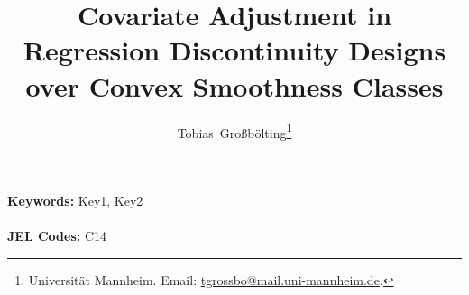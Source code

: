\documentclass[12pt]{article}
\title{Covariate Adjustment in Regression Discontinuity Designs over Convex Smoothness Classes}
\author{
Tobias~Großbölting\thanks{Universität Mannheim. Email: \href{tgrossbo@mail.uni-mannheim.de}{tgrossbo@mail.uni-mannheim.de}.}
}
\begin{document}
\maketitle


 

\vspace{0.1in}
\noindent\textbf{Keywords:} Key1, Key2\\
\vspace{0in}\\
\noindent\textbf{JEL Codes:} C14\\

\clearpage


%





%

%

\clearpage

\onehalfspacing

\printbibliography

\clearpage

\renewcommand\thesection{\Alph{section}}
\renewcommand\thesubsection{\thesection.\Roman{subsection}}
\end{document}
